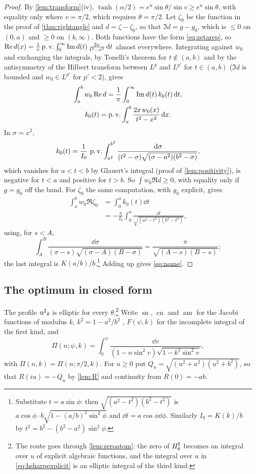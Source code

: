 \begin{proof}
By \cref{lem:transform}(iv), $\tanh(\alpha/2)=e^u\sin\theta/\sin v\ge e^u\sin\theta$,
with equality only where $v=\pi/2$, which requires $\theta=\pi/2$. Let
$\zeta_0$ be the function in the proof of \cref{thm:rightangle} and
$d=\zeta-\zeta_0$, so that $\Im d=g-g_0$, which is $\le0$ on $(0,a)$ and $\ge0$
on $(b,\infty)$. Both functions have the form \eqref{eq:zetarep}, so
$\operatorname{Re} d(x)=\frac1\pi\operatorname{p.v.}\int_0^\infty\operatorname{Im} d(t)\,\frac{2x}{t^2-x^2}\,\mathrm d t$ almost
everywhere. Integrating against $w_0$ and exchanging the integrals, by
Tonelli's theorem for $t\notin(a,b)$ and by the antisymmetry of the Hilbert
transform between $L^p$ and $L^{p'}$ for $t\in(a,b)$ ($\Im d$ is bounded and
$w_0\in L^{p'}$ for $p'<2$), gives
\begin{gather*}
\int_a^bw_0\operatorname{Re} d=\frac1\pi\int_0^\infty\operatorname{Im} d(t)\,k_0(t)\,\mathrm d t,\\
k_0(t)=\operatorname{p.v.}\int_a^b\frac{2x\,w_0(x)}{t^2-x^2}\,\mathrm d x .
\end{gather*}
In $\sigma=x^2$,
\[
k_0(t)=\frac1{I_0}\,\operatorname{p.v.}\int_{a^2}^{b^2}\frac{\,\mathrm d\sigma}{(t^2-\sigma)\sqrt{(\sigma-a^2)(b^2-\sigma)}},
\]
which vanishes for $a<t<b$ by Glauert's integral (proof of
\cref{lem:positivity}), is negative for $t<a$ and positive for $t>b$. So
$\int w_0\Re d\ge0$, with equality only if $g=g_0$ off the band. For
$\zeta_0$ the same computation, with $g_0$ explicit, gives
\begin{align*}
\int_a^bw_0\Re\zeta_0&=\int_0^ak_0(t)\dd t\\
&=-\frac\pi{I_0}\int_0^a\frac{\dd t}{\sqrt{(a^2-t^2)(b^2-t^2)}} ,
\end{align*}
using, for $s<A$,
\[
\int_A^B\frac{\dd\sigma}{(\sigma-s)\sqrt{(\sigma-A)(B-\sigma)}}=\frac\pi{\sqrt{(A-s)(B-s)}} ;
\]
the last integral is $K(a/b)/b$.\footnote{Substitute $t=a\sin\phi$: then $\sqrt{(a^2-t^2)(b^2-t^2)}$ is
$a\cos\phi\cdot b\sqrt{1-(a/b)^2\sin^2\phi}$ and $\dd t=a\cos\phi\dd\phi$.
Similarly $I_0=K(k)/b$ by $t^2=b^2-(b^2-a^2)\sin^2\phi$.} Adding up gives \eqref{eq:nome}.
\end{proof}

\subsection{The optimum in closed form}\label{ssec:closedform}

The profile ${\alpha^{\sharp}}_\theta$ is elliptic for every $\theta$.\footnote{The route
goes through \cref{lem:zeroatom}: the zero of $H^{\sharp}_\theta$ becomes an
integral over $u$ of explicit algebraic functions, and the integral over $u$
in \eqref{eq:hsharpexplicit} is an elliptic integral of the third kind.} Write $\operatorname{sn}$,
$\operatorname{cn}$ and $\operatorname{am}$ for the Jacobi functions of
modulus $k$, $k^2=1-a^2/b^2$ \cite[Ch.~22]{dlmf}, $F(\psi,k)$ for the
incomplete integral of the first kind, and
\[
\Pi(n;\psi,k)=\int_0^\psi\frac{\dd v}{(1-n\sin^2v)\sqrt{1-k^2\sin^2v}},
\]
with $\Pi(n,k)=\Pi(n;\pi/2,k)$. For $u\ge0$ put
$Q_u=\sqrt{(u^2+a^2)(u^2+b^2)}$, so that $R(iu)=-Q_u$ by \cref{lem:R} and
continuity from $R(0)=-ab$.

